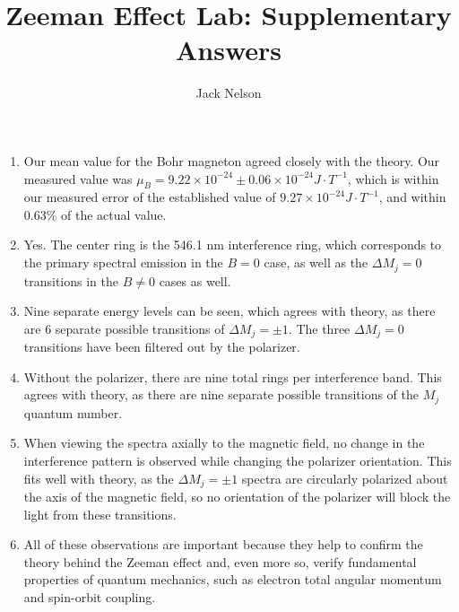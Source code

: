 \documentclass[]{article}
\title{Zeeman Effect Lab: Supplementary Answers}
\author{Jack Nelson}
\begin{document}
\maketitle

\begin{enumerate}
	\item Our mean value for the Bohr magneton agreed closely with the theory. Our measured value was $\mu_B = 9.22\times10^{-24}\pm 0.06\times10^{-24} J\cdot T^{-1}$, which is within our measured error of the established value of $9.27\times10^{-24} J\cdot T^{-1}$, and within 0.63\% of the actual value.
	
	\item Yes. The center ring is the 546.1 nm interference ring, which corresponds to the primary spectral emission in the $B=0$ case, as well as the $\Delta M_j = 0$ transitions in the $B\neq0$ cases as well.
	
	\item Nine separate energy levels can be seen, which agrees with theory, as there are 6 separate possible transitions of $\Delta M_j=\pm1$.
	The three $\Delta M_j=0$ transitions have been filtered out by the polarizer.
	
	\item Without the polarizer, there are nine total rings per interference band.
	This agrees with theory, as there are nine separate possible transitions of the $M_j$ quantum number.
	
	\item When viewing the spectra axially to the magnetic field, no change in the interference pattern is observed while changing the polarizer orientation. This fits well with theory, as the $\Delta M_j=\pm1$ spectra are circularly polarized about the axis of the magnetic field, so no orientation of the polarizer will block the light from these transitions.
	
	\item All of these observations are important because they help to confirm the theory behind the Zeeman effect and, even more so, verify fundamental properties of quantum mechanics, such as electron total angular momentum and spin-orbit coupling.
\end{enumerate}
\end{document}
